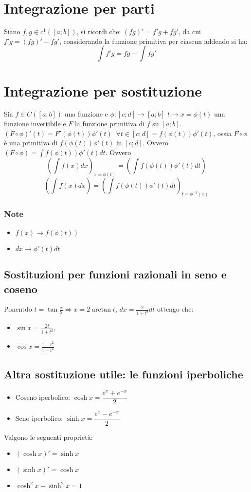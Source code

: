 \section{Integrazione per parti}
Siano $f,g\in c^1([a;b])$, si ricordi che: $(fg)'=f'g+fg'$, da cui $f'g=(fg)'-fg'$, considerando la funzione primitiva per ciascun addendo si ha: 
\begin{equation}
\int f'g=fg-\int fg'
\end{equation}
\section{Integrazione per sostituzione}
Sia $f\in C([a;b])$ una funzione e $\phi:[c;d]\rightarrow[a;b]$ $t\rightarrow x=\phi(t)$ una funzione invertibile e $F$ la funzione primitiva di $f$ su $[a;b]$. $(F\circ\phi)'(t)=F'(\phi(t))\phi'(t)\;\;\forall t\in [c;d] =f(\phi(t))\phi'(t)$, ossia $F\circ\phi$ \`e una primitiva di $f(\phi(t))\phi'(t)$ in $[c;d]$. Ovvero $(F\circ\phi)=\int f(\phi(t))\phi'(t)dt$. Ovvero
\begin{equation}
(\int f(x)dx)_{x=\phi(t)}=(\int f(\phi(t))\phi'(t)dt)
\end{equation}
\begin{equation}
(\int f(x)dx)=(\int f(\phi(t))\phi'(t)dt)_{t=\phi^{-1}(x)}
\end{equation}
\subsubsection{Note}
\begin{itemize}
\item $f(x)\rightarrow f(\phi(t))$
\item $dx\rightarrow \phi'(t)dt$
\end{itemize}
\subsection{Sostituzioni per funzioni razionali in seno e coseno}
Ponentdo $t=\tan\frac{x}{2}\Rightarrow x=2\arctan t$, $dx=\frac{2}{1+t^2}dt$ ottengo che:
\begin{itemize}
\item $\sin x=\frac{2t}{1+t^2}$,
\item $\cos x=\frac{1-t^2}{1+t^2}$
\end{itemize}
\subsection{Altra sostituzione utile: le funzioni iperboliche}
\begin{itemize}
\item Coseno iperbolico: $\cosh x=\dfrac{e^x+e^{-x}}{2}$
\item Seno iperbolico: $\sinh x=\dfrac{e^x-e^{-x}}{2}$
\end{itemize}
Valgono le seguenti propriet\`a:
\begin{itemize}
\item $(\cosh x)'=\sinh x$
\item $(\sinh x)'=\cosh x$
\item $\cosh^2 x-\sinh^2 x=1$
\end{itemize}
